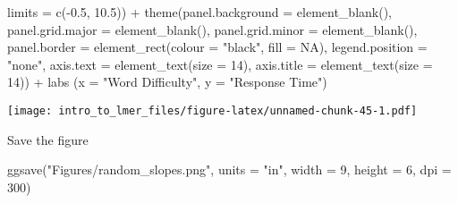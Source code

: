 \documentclass[
]{article}
\newenvironment{Shaded}{\begin{snugshade}}{\end{snugshade}}
\newcommand{\AttributeTok}[1]{\textcolor[rgb]{0.77,0.63,0.00}{#1}}
\newcommand{\ConstantTok}[1]{\textcolor[rgb]{0.00,0.00,0.00}{#1}}
\newcommand{\DecValTok}[1]{\textcolor[rgb]{0.00,0.00,0.81}{#1}}
\newcommand{\FloatTok}[1]{\textcolor[rgb]{0.00,0.00,0.81}{#1}}
\newcommand{\FunctionTok}[1]{\textcolor[rgb]{0.00,0.00,0.00}{#1}}
\newcommand{\NormalTok}[1]{#1}
\newcommand{\SpecialCharTok}[1]{\textcolor[rgb]{0.00,0.00,0.00}{#1}}
\newcommand{\StringTok}[1]{\textcolor[rgb]{0.31,0.60,0.02}{#1}}
\begin{document}
\begin{Shaded}
\begin{Highlighting}[]
                     \AttributeTok{limits =} \FunctionTok{c}\NormalTok{(}\SpecialCharTok{{-}}\FloatTok{0.5}\NormalTok{, }\FloatTok{10.5}\NormalTok{)) }\SpecialCharTok{+}
  \FunctionTok{theme}\NormalTok{(}\AttributeTok{panel.background =} \FunctionTok{element\_blank}\NormalTok{(),         }
        \AttributeTok{panel.grid.major =} \FunctionTok{element\_blank}\NormalTok{(),}
        \AttributeTok{panel.grid.minor =} \FunctionTok{element\_blank}\NormalTok{(),}
        \AttributeTok{panel.border =} \FunctionTok{element\_rect}\NormalTok{(}\AttributeTok{colour =} \StringTok{"black"}\NormalTok{, }\AttributeTok{fill =} \ConstantTok{NA}\NormalTok{),}
        \AttributeTok{legend.position =} \StringTok{"none"}\NormalTok{, }
        \AttributeTok{axis.text =} \FunctionTok{element\_text}\NormalTok{(}\AttributeTok{size =} \DecValTok{14}\NormalTok{),}
        \AttributeTok{axis.title =} \FunctionTok{element\_text}\NormalTok{(}\AttributeTok{size =} \DecValTok{14}\NormalTok{)) }\SpecialCharTok{+}
  \FunctionTok{labs}\NormalTok{ (}\AttributeTok{x =} \StringTok{"Word Difficulty"}\NormalTok{, }\AttributeTok{y =} \StringTok{"Response Time"}\NormalTok{) }
\end{Highlighting}
\end{Shaded}

\texttt{[image: intro\_to\_lmer\_files/figure-latex/unnamed-chunk-45-1.pdf]}

Save the figure

\begin{Shaded}
\begin{Highlighting}[]
\FunctionTok{ggsave}\NormalTok{(}\StringTok{"Figures/random\_slopes.png"}\NormalTok{, }\AttributeTok{units =} \StringTok{"in"}\NormalTok{, }\AttributeTok{width =} \DecValTok{9}\NormalTok{, }\AttributeTok{height =} \DecValTok{6}\NormalTok{, }\AttributeTok{dpi =} \DecValTok{300}\NormalTok{)}
\end{Highlighting}
\end{Shaded}
\end{document}
